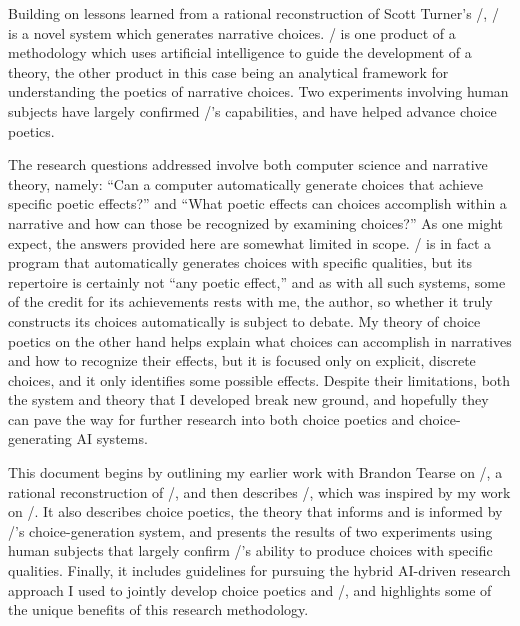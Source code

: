 Building on lessons learned from a rational reconstruction of Scott Turner's \minstrel/, \dunyazad/ is a novel system which generates narrative choices.
%
\dunyazad/ is one product of a methodology which uses artificial intelligence to guide the development of a theory, the other product in this case being an analytical framework for understanding the poetics of narrative choices.
%
Two experiments involving human subjects have largely confirmed \dunyazad/'s capabilities, and have helped advance choice poetics.


The research questions addressed involve both computer science and narrative theory, namely: ``Can a computer automatically generate choices that achieve specific poetic effects?'' and ``What poetic effects can choices accomplish within a narrative and how can those be recognized by examining choices?''
%
As one might expect, the answers provided here are somewhat limited in scope.
%
\dunyazad/ is in fact a program that automatically generates choices with specific qualities, but its repertoire is certainly not ``any poetic effect,'' and as with all such systems, some of the credit for its achievements rests with me, the author, so whether it truly constructs its choices automatically is subject to debate.
%
My theory of choice poetics on the other hand helps explain what choices can accomplish in narratives and how to recognize their effects, but it is focused only on explicit, discrete choices, and it only identifies some possible effects.
%
Despite their limitations, both the system and theory that I developed break new ground, and hopefully they can pave the way for further research into both choice poetics and choice-generating AI systems.


This document begins by outlining my earlier work with Brandon Tearse on \skald/, a rational reconstruction of \minstrel/, and then describes \dunyazad/, which was inspired by my work on \skald/.
%
It also describes choice poetics, the theory that informs and is informed by \dunyazad/'s choice-generation system, and presents the results of two experiments using human subjects that largely confirm \dunyazad/'s ability to produce choices with specific qualities.
%
Finally, it includes guidelines for pursuing the hybrid AI-driven research approach I used to jointly develop choice poetics and \dunyazad/, and highlights some of the unique benefits of this research methodology.
